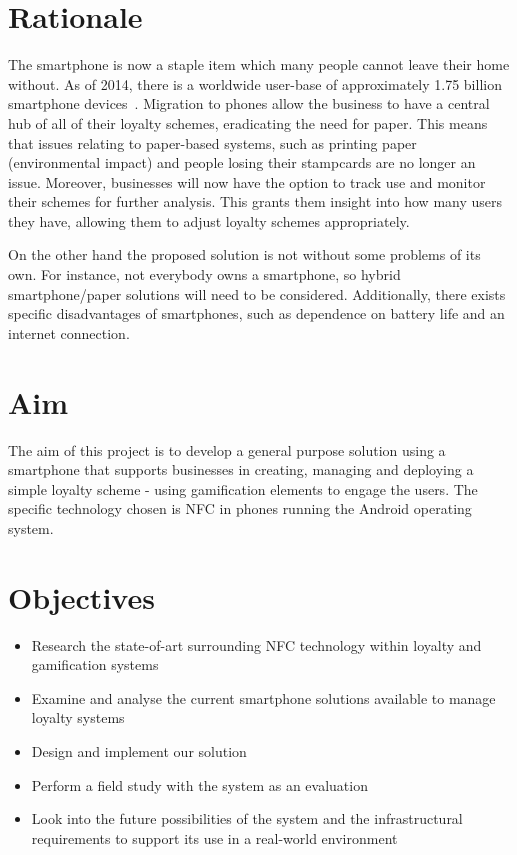 \section{Rationale}
The smartphone is now a staple item which many people cannot leave their home without. As of 2014, there is a worldwide user-base of approximately 1.75 billion smartphone devices~\cite{smartUsers}. Migration to phones allow the business to have a central hub of all of their loyalty schemes, eradicating the need for paper. This means that issues relating to paper-based systems, such as printing paper (environmental impact) and people losing their stampcards are no longer an issue. Moreover, businesses will now have the option to track use and monitor their schemes for further analysis. This grants them insight into how many users they have, allowing them to adjust loyalty schemes appropriately.

On the other hand the proposed solution is not without some problems of its own. For instance, not everybody owns a smartphone, so hybrid smartphone/paper solutions will need to be considered. Additionally, there exists specific disadvantages of smartphones, such as dependence on battery life and an internet connection.

\section{Aim}
The aim of this project is to develop a general purpose solution using a smartphone that supports businesses in creating, managing and deploying a simple loyalty scheme - using gamification elements to engage the users. The specific technology chosen is NFC in phones running the Android operating system. 

\section{Objectives}
\begin{itemize}
    \item Research the state-of-art surrounding NFC technology within loyalty and gamification systems
    \item Examine and analyse the current smartphone solutions available to manage loyalty systems
    \item Design and implement our solution
    \item Perform a field study with the system as an evaluation
    \item Look into the future possibilities of the system and the infrastructural requirements to support its use in a real-world environment
\end{itemize}

